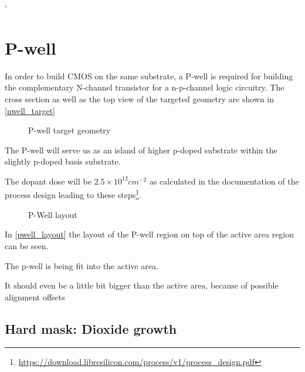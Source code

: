 `\section{P-well}\label{pwell_chapter}
In order to build CMOS on the same substrate, a P-well is required for building the complementary N-channel transistor for a n-p-channel logic circuitry.
The cross section as well as the top view of the targeted geometry are shown in \autoref{nwell_target}
\begin{figure}[H]
	\centering
	\begin{tikzpicture}[node distance = 3cm, auto, thick,scale=\CrossAndTopSectionBig, every node/.style={transform shape}]
		
	\end{tikzpicture}
	\begin{tikzpicture}[node distance = 3cm, auto, thick,scale=\CrossAndTopSectionBig, every node/.style={transform shape}]
		
	\end{tikzpicture}
	\caption{P-well target geometry}
	\label{pwell_target}
\end{figure}
The P-well will serve us as an island of higher p-doped substrate within the slightly p-doped basis substrate.

The dopant dose will be $2.5\times10^{12}cm^{-2}$ as calculated in the documentation of the process design leading to these steps\footnote{\url{https://download.libresilicon.com/process/v1/process_design.pdf}}.

\begin{figure}[H]
	\centering
	\begin{tikzpicture}[node distance =1cm, auto, thick,scale=\VLSILayout, every node/.style={transform shape}]
		
	\end{tikzpicture}
	\caption{P-Well layout}
	\label{pwell_layout}
\end{figure}

In \autoref{pwell_layout} the layout of the P-well region on top of the active area region can be seen.

The p-well is being fit into the active area.

It should even be a little bit bigger than the active area, because of possible alignment offsets

\newpage

\subsection{Hard mask: Dioxide growth}

